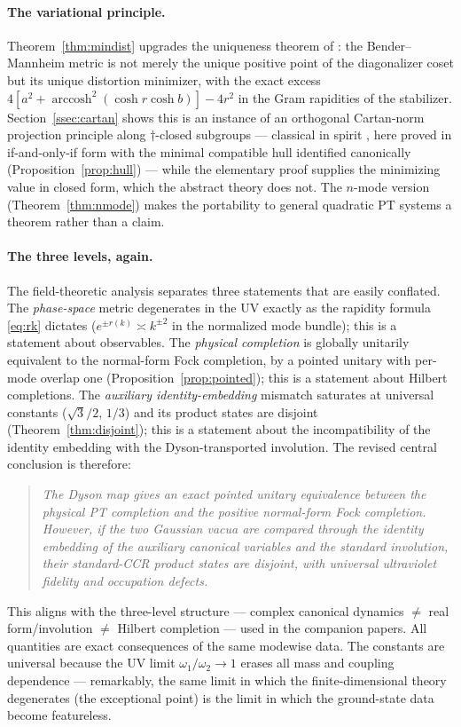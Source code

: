 \documentclass[11pt]{article}
\theoremstyle{definition}
\theoremstyle{remark}
\newcommand{\w}{\omega}
\newcommand{\dg}{\dagger}
\newcommand{\arccosh}{\operatorname{arccosh}}
\begin{document}
\paragraph{The variational principle.}
Theorem~\ref{thm:mindist} upgrades the uniqueness theorem of
\cite{companion}: the Bender--Mannheim metric is not merely the unique
positive point of the diagonalizer coset but its unique distortion minimizer,
with the exact excess $4[a^2+\arccosh^2(\cosh r\cosh b)]-4r^2$ in the Gram
rapidities of the stabilizer.  Section~\ref{ssec:cartan} shows this is an
instance of an orthogonal Cartan-norm projection principle along
$\dg$-closed subgroups --- classical in spirit
\cite{Mostow1955,KempfNess1979}, here proved in if-and-only-if form with
the minimal compatible hull identified canonically
(Proposition~\ref{prop:hull}) --- while the elementary proof supplies the
minimizing value in closed form, which the abstract theory does not.  The
$n$-mode version (Theorem~\ref{thm:nmode}) makes the portability to
general quadratic PT systems a theorem rather than a claim.

\paragraph{The three levels, again.}
The field-theoretic analysis separates three statements that are easily
conflated.  The \emph{phase-space} metric degenerates in the UV exactly as
the rapidity formula \eqref{eq:rk} dictates ($e^{\pm r(k)}\asymp
k^{\pm2}$ in the normalized mode bundle); this is a statement about
observables.  The \emph{physical completion} is globally unitarily
equivalent to the normal-form Fock completion, by a pointed unitary with
per-mode overlap one (Proposition~\ref{prop:pointed}); this is a
statement about Hilbert completions.  The \emph{auxiliary
identity-embedding} mismatch saturates at universal constants
($\sqrt3/2$, $1/3$) and its product states are disjoint
(Theorem~\ref{thm:disjoint}); this is a statement about the
incompatibility of the identity embedding with the Dyson-transported
involution.  The revised central conclusion is therefore:
\begin{quote}
\emph{The Dyson map gives an exact pointed unitary equivalence between
the physical PT completion and the positive normal-form Fock completion.
However, if the two Gaussian vacua are compared through the identity
embedding of the auxiliary canonical variables and the standard
involution, their standard-CCR product states are disjoint, with
universal ultraviolet fidelity and occupation defects.}
\end{quote}
This aligns with the three-level structure --- complex canonical dynamics
$\neq$ real form/involution $\neq$ Hilbert completion --- used in the
companion papers.  All quantities are exact consequences of the same
modewise data.  The constants are universal because the UV limit
$\w_1/\w_2\to1$ erases all mass and coupling dependence --- remarkably, the
same limit in which the finite-dimensional theory degenerates (the
exceptional point) is the limit in which the ground-state data become
featureless.
\end{document}
